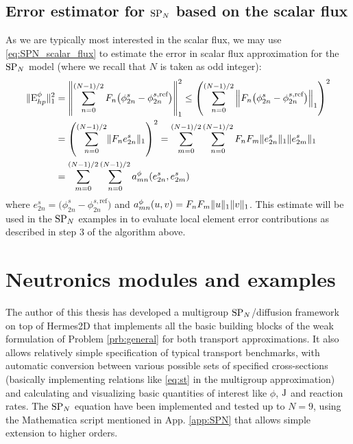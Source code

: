 \subsection{Error estimator for $\SPN$ based on the scalar flux}\label{sec:errest}
As we are typically most interested in the scalar flux, we may use \eqref{eq:SPN_scalar_flux} to estimate the
error in scalar flux approximation for the $\SPN$ model (where we recall that $N$ is taken as odd integer):
\begin{equation}\label{eq:err-est-phi}
\begin{aligned}
	\norm[1]{\Ehp^{\phi}}^2 &= \left\Vert\suma[n]{0}{(N-1)/2}{F_{n}}\bigl(\phi^s_{2n} -
	\phi^{s,\text{ref}}_{2n}\bigr)\right\Vert_1^2 
	\leq  \left(\suma[n]{0}{(N-1)/2}\left\Vert F_{n}\bigl(\phi^s_{2n} -
	\phi^{s,\text{ref}}_{2n}\bigr)\right\Vert_1\right)^2\\
	&= \left(\suma[n]{0}{(N-1)/2} \norm[1]{F_{n} e^s_{2n}}\right)^2
	= \suma[m]{0}{(N-1)/2}\suma[n]{0}{(N-1)/2} F_{n}F_{m}\norm[1]{e^s_{2n}}\norm[1]{e^s_{2m}}\\
	&= \suma[m]{0}{(N-1)/2}\suma[n]{0}{(N-1)/2} a^\phi_{mn}(e^s_{2n}, e^s_{2m})
\end{aligned} 
\end{equation}
where $e^s_{2n} = \bigl(\phi^s_{2n} - \phi^{s,\text{ref}}_{2n}\bigr)$ and $a^\phi_{mn}(u,v) =
F_{n}F_{m}\norm[1]{u}\norm[1]{v}$.
This estimate will be used in the $\SPN$ examples in  to evaluate local element error contributions as
described in step 3 of the algorithm above.

\section{Neutronics modules and examples}
The author of this thesis has developed a multigroup $\SPN$/diffusion framework on top of Hermes2D that implements all
the basic building blocks of the weak formulation of Problem \ref{prb:general} for both transport approximations. It also allows
relatively simple specification of typical transport benchmarks, with automatic conversion between various possible sets
of specified cross-sections (basically implementing relations like \eqref{eq:st} in the multigroup approximation) and
calculating and visualizing basic quantities of interest like $\phi$, $\bJ$ and reaction rates. The $\SPN$ equation have
been implemented and tested up to $N = 9$, using the Mathematica script mentioned in App. \ref{app:SPN} that allows
simple extension to higher orders.


